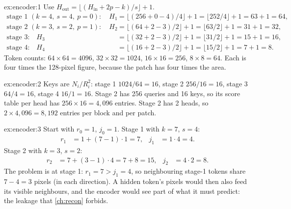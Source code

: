 
\begin{solution}{ex:encoder:1}
Use $H_{\text{out}} = \lfloor (H_{\text{in}} + 2p - k)/s \rfloor + 1$.
\begin{align*}
\text{stage 1 } (k=4,\ s=4,\ p=0):\quad H_1 &= \lfloor (256 + 0 - 4)/4 \rfloor + 1 = \lfloor 252/4 \rfloor + 1 = 63 + 1 = 64,\\
\text{stage 2 } (k=3,\ s=2,\ p=1):\quad H_2 &= \lfloor (64 + 2 - 3)/2 \rfloor + 1 = \lfloor 63/2 \rfloor + 1 = 31 + 1 = 32,\\
\text{stage 3:}\quad H_3 &= \lfloor (32 + 2 - 3)/2 \rfloor + 1 = \lfloor 31/2 \rfloor + 1 = 15 + 1 = 16,\\
\text{stage 4:}\quad H_4 &= \lfloor (16 + 2 - 3)/2 \rfloor + 1 = \lfloor 15/2 \rfloor + 1 = 7 + 1 = 8.
\end{align*}
Token counts: $64 \times 64 = 4096$, $32 \times 32 = 1024$, $16 \times 16 = 256$, $8 \times 8 = 64$.
Each is four times the 128-pixel figure, because the patch has four times the area.
\end{solution}

\begin{solution}{ex:encoder:2}
Keys are $N_i / R_i^2$: stage 1 $1024/64 = 16$, stage 2 $256/16 = 16$, stage 3 $64/4 = 16$, stage 4
$16/1 = 16$. Stage 2 has 256 queries and 16 keys, so its score table per head has
$256 \times 16 = 4{,}096$ entries. Stage 2 has 2 heads, so $2 \times 4{,}096 = 8{,}192$ entries per
block and per patch.
\end{solution}

\begin{solution}{ex:encoder:3}
Start with $r_0 = 1$, $j_0 = 1$. Stage 1 with $k = 7$, $s = 4$:
\begin{align*}
r_1 &= 1 + (7-1)\cdot 1 = 7, & j_1 &= 1 \cdot 4 = 4.
\end{align*}
Stage 2 with $k = 3$, $s = 2$:
\begin{align*}
r_2 &= 7 + (3-1)\cdot 4 = 7 + 8 = 15, & j_2 &= 4 \cdot 2 = 8.
\end{align*}
The problem is at stage 1: $r_1 = 7 > j_1 = 4$, so neighbouring stage-1 tokens share $7 - 4 = 3$ pixels
(in each direction). A hidden token's pixels would then also feed its visible neighbours, and the
encoder would see part of what it must predict: the leakage that \cref{ch:recon} forbids.
\end{solution}

